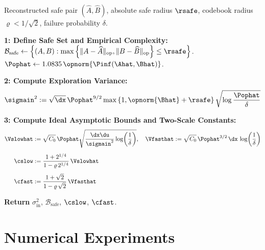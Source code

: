 \documentclass[11pt,journal,onecolumn]{IEEEtran}
\begin{document}
\begin{algorithm}
    \caption{\textsc{SafeRoundInit}$(\widehat{A}, \widehat{B}, \rsafe, \varrho, \delta)$}
    \label{alg:saferound}
    \begin{algorithmic}[1]
        \Require Reconstructed safe pair $(\widehat{A}, \widehat{B})$, absolute safe radius $\rsafe$, codebook radius $\varrho < 1/\sqrt{2}$, failure probability $\delta$.
        \vspace{0.3em}

        \State \textbf{1: Define Safe Set and Empirical Complexity:}
        \State $\mathcal{B}_{\mathrm{safe}} \gets \left\{(A, B): \max\left\{\| A - \widehat{A}\|_{\mathrm{op}}, \| B - \widehat{B}\|_{\mathrm{op}}\right\} \leq \rsafe\right\}$.
        \State $\Pophat \gets 1.0835\,\opnorm{\Pinf(\Ahat, \Bhat)}$.
        \vspace{0.3em}

        \State \textbf{2: Compute Exploration Variance:}
        \vspace{-0.5em}
        \[
            \sigmain^2 := \sqrt{\dx}\,\Pophat^{9/2} \max\left\{1, \opnorm{\Bhat} + \rsafe\right\} \sqrt{\log \frac{\Pophat}{\delta}}
        \]

        \State \textbf{3: Compute Ideal Asymptotic Bounds and Two-Scale Constants:}
        \vspace{-0.5em}
        \begin{align*}
            \Vslowhat &:= \sqrt{C_0}\,\Pophat \sqrt{\frac{\dx\du}{\sigmain^2} \log\!\left(\frac{1}{\delta}\right)}, \quad
            \Vfasthat := \sqrt{C_0}\,\Pophat^{3/2}\,\dx\,\log\!\left(\frac{1}{\delta}\right) \\[0.5em]
            \cslow &:= \frac{1 + 2^{1/4}}{1 - \varrho\,2^{1/4}}\,\Vslowhat \\[0.5em]
            \cfast &:= \frac{1+\sqrt{2}}{1 - \varrho\,\sqrt{2}}\,\Vfasthat
        \end{align*}

        \State \textbf{Return}  $\sigma_{\mathrm{in}}^2$, $\mathcal{B}_{\mathrm{safe}}$, $\cslow$, $\cfast$.

    \end{algorithmic}
\end{algorithm}



\section{Numerical Experiments}
\label{sec:experiments}
\end{document}
